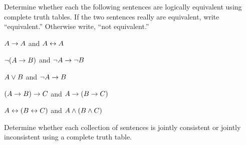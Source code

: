 \problempart
\label{pr.TT.equiv2}
Determine whether each the following sentences are logically equivalent using complete truth tables. If the two sentences really are equivalent, write ``equivalent.'' Otherwise write, ``not equivalent.''
\begin{earg}
\item $A\rightarrow A$ and $A \leftrightarrow A$
\item $\neg(A \rightarrow B)$ and $\neg A \rightarrow \neg B$
\item $A \vee B$ and $\neg A \rightarrow B$
\item$(A \rightarrow B) \rightarrow C$ and $A \rightarrow (B \rightarrow C)$
\item $A \leftrightarrow (B \leftrightarrow C)$ and $A \wedge (B \wedge C)$
\end{earg}


\problempart
\label{pr.TT.consistent2}
Determine whether each collection of sentences is jointly consistent or jointly inconsistent using a complete truth table. 
